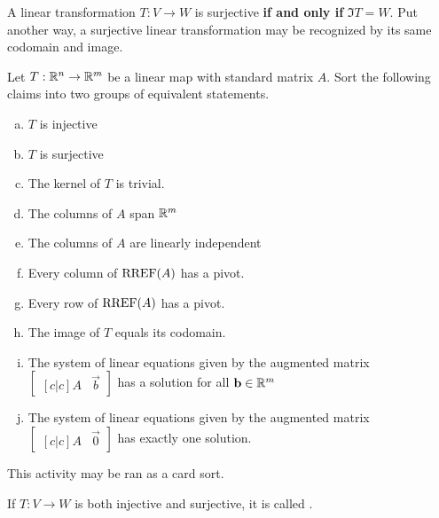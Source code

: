 \begin{applicationActivities}{3}{19}
\begin{fact}
A linear transformation $T:V \rightarrow W$ is surjective \textbf{if and only if} $\Im T = W$. Put another way, a surjective linear transformation may be
recognized by its same codomain and image.
\end{fact}

\begin{activity}{15}
Let $T: \mathbb{R}^n \rightarrow \mathbb{R}^m$ be a linear map with standard matrix $A$.
Sort the following claims into two groups of equivalent statements.
\begin{multicols}{2}
\begin{enumerate}[(a)]
\item $T$ is injective
\item $T$ is surjective
\item The kernel of \(T\) is trivial.
\item The columns of $A$ span $\mathbb{R}^m$
\item The columns of $A$ are linearly independent
\item Every column of $\operatorname{RREF}(A)$ has a pivot.
\item Every row of $\operatorname{RREF}(A)$ has a pivot.
\item The image of \(T\) equals its codomain.
\item The system of linear equations given by the augmented matrix $\begin{bmatrix}[c|c]A & \vec{b} \end{bmatrix}$ has a solution for all $\mathbf{b} \in \mathbb{R}^m$
\item The system of linear equations given by the augmented matrix $\begin{bmatrix}[c|c] A & \vec{0} \end{bmatrix}$ has exactly one solution.
\end{enumerate}
\end{multicols}
\begin{TBLnote}
  This activity may be ran as a card sort.
\end{TBLnote}


\end{activity}

\begin{definition}
If $T: V \rightarrow W$ is both injective and surjective, it is called .
\end{definition}


\end{applicationActivities}

